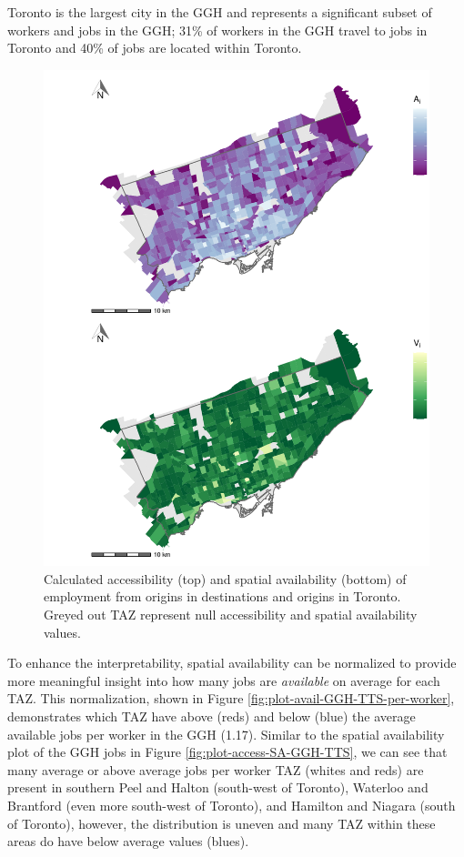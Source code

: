 \documentclass[]{elsarticle} %
\begin{document}
Toronto is the largest city in the GGH and represents a significant
subset of workers and jobs in the GGH; 31\% of workers in the GGH travel
to jobs in Toronto and 40\% of jobs are located within Toronto.

\begin{figure}
\includegraphics[width=1\linewidth]{Spatial-Availability-Refreshed_files/figure-latex/plot-access-SA-TO-1} \caption{\label{fig:plot-access-SA-TO}Calculated accessibility (top) and spatial availability (bottom) of employment from origins in destinations and origins in Toronto. Greyed out TAZ represent null accessibility and spatial availability values.}\label{fig:plot-access-SA-TO}
\end{figure}

To enhance the interpretability, spatial availability can be normalized
to provide more meaningful insight into how many jobs are
\emph{available} on average for each TAZ. This normalization, shown in
Figure \ref{fig:plot-avail-GGH-TTS-per-worker}, demonstrates which TAZ
have above (reds) and below (blue) the average available jobs per worker
in the GGH (1.17). Similar to the spatial availability plot of the GGH
jobs in Figure \ref{fig:plot-access-SA-GGH-TTS}, we can see that many
average or above average jobs per worker TAZ (whites and reds) are
present in southern Peel and Halton (south-west of Toronto), Waterloo
and Brantford (even more south-west of Toronto), and Hamilton and
Niagara (south of Toronto), however, the distribution is uneven and many
TAZ within these areas do have below average values (blues).
\end{document}
